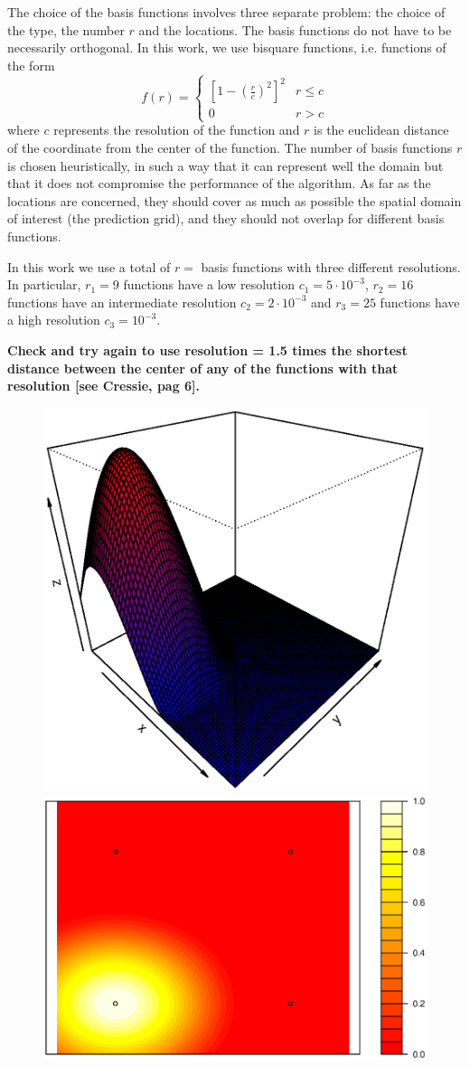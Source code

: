 \documentclass[11pt]{article}
\begin{document}
The choice of the basis functions involves three separate problem: the choice of the type, the number $r$ and the locations. The basis functions do not have to be necessarily orthogonal. In this work, we use bisquare functions, i.e. functions of the form
\begin{equation*}
f(r) = \begin{cases}
\left[ 1 - \left( \frac{r}{c} \right)^2 \right]^2 & r \leq c
\\
0 & r > c
\end{cases}
\end{equation*}
where $c$ represents the resolution of the function and $r$ is the euclidean distance of the coordinate from the center of the function. The number of basis functions $r$ is chosen heuristically, in such a way that it can represent well the domain but that it does not compromise the performance of the algorithm. As far as the locations are concerned, they should cover as much as possible the spatial domain of interest (the prediction grid), and they should not overlap for different basis functions.

In this work we use a total of $r = $ basis functions with three different resolutions. In particular, $r_1 = 9$ functions have a low resolution $c_1 = 5 \cdot 10^{-3}$, $r_2 = 16$ functions have an intermediate resolution $c_2 = 2 \cdot 10^{-3}$ and $r_3 = 25$ functions have a high resolution $c_3 = 10^{-3}$. 

\textbf{Check and try again to use resolution = 1.5 times the shortest distance between the center of any of the functions with that resolution [see Cressie, pag 6].}

\begin{figure}[!ht]
\centering
\includegraphics[width=0.55\columnwidth]{./Images/res1}
\includegraphics[width=0.44\columnwidth]{./Images/res11}
\caption{}
\label{fig:res1}
\end{figure}
\end{document}
